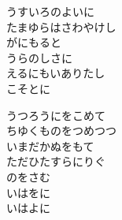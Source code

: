 \documentclass[10pt,b5j]{tarticle} %
\begin{document}
\begin{enumerate}
\begin{minipage}[c]{\blocksize}
        \vspace{\linespace}
        \item
        うすいろのよいに\\
        たまゆらはさわやけし\\
        がにもると\\
        うらのしさに\\
        えるにもいありたし\\
        こそとに
        
        \vspace{\linespace}
        \item
        うつろうにをこめて\\
        ちゆくものをつめつつ\\
        いまだかぬをもて\\
        ただひたすらにりぐ\\
        のをさむ\\
        いはをに\\
        いはよに
    
    \end{minipage}
\end{enumerate} %
\end{document}
